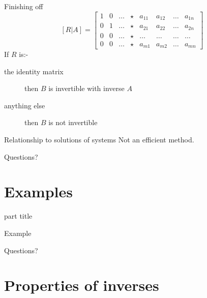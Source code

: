 \documentclass{beamer}
\begin{document}
\begin{frame}{Finishing off}
  \begin{equation*}
    \left[R|A\right]=
    \left[
      \begin{array}{cccc|cccc}
        1 & 0 & \dots & \star & a_{11} & a_{12} &\dots & a_{1n}\\
        0 & 1 & \dots & \star & a_{21} & a_{22} &\dots & a_{2n}\\
        0 & 0 & \dots & \star & \dots & \dots &\dots & \dots\\
        0 & 0 & \dots & \star & a_{m1} & a_{m2} &\dots & a_{mn}
      \end{array}
    \right]
  \end{equation*}\vfill
  If $R$ is:-\vfill
  \begin{description}
  \item [the identity matrix] then $B$ is invertible with inverse $A$\vfill
  \item [anything else] then $B$ is not invertible
  \end{description}
\end{frame}

\begin{frame}{Relationship to solutions of systems}
  Not an efficient method.
\end{frame}

\begin{frame}
  Questions?
\end{frame}

\section{Examples}

\begin{frame}
  \begin{beamercolorbox}[sep=12pt,center]{part title}
    \insertsection\par
  \end{beamercolorbox}
\end{frame}

\begin{frame}{Example}
  
\end{frame}

\begin{frame}
  Questions?
\end{frame}

\section{Properties of inverses}
\end{document}
